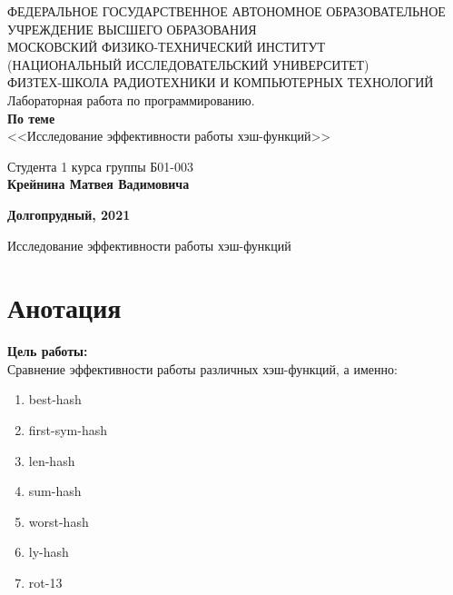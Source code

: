 \documentclass[a4paper,12pt]{article}
\begin{document}
\begin{center}
	\hfill \break
	\hfill \break
	{\small ФЕДЕРАЛЬНОЕ ГОСУДАРСТВЕННОЕ АВТОНОМНОЕ ОБРАЗОВАТЕЛЬНОЕ\\ УЧРЕЖДЕНИЕ ВЫСШЕГО ОБРАЗОВАНИЯ\\ МОСКОВСКИЙ ФИЗИКО-ТЕХНИЧЕСКИЙ ИНСТИТУТ\\ (НАЦИОНАЛЬНЫЙ ИССЛЕДОВАТЕЛЬСКИЙ УНИВЕРСИТЕТ)\\ ФИЗТЕХ-ШКОЛА РАДИОТЕХНИКИ И КОМПЬЮТЕРНЫХ ТЕХНОЛОГИЙ}\\

	\hfill \break
	\normalsize{Лабораторная работа по программированию. }\\
	\vspace{7em}
	\normalsize{\textbf{По теме}}\\
	\vspace{7em}
	\large{<<Исследование эффективности работы хэш-функций>>}\\
\end{center}

\vspace{16em}
\begin{flushright}
	\normalsize{Студента 1 курса группы Б01-003}\\
	\normalsize{\textbf{Крейнина Матвея Вадимовича}}\\
\end{flushright}

\vspace{\fill}
\begin{center}
	\normalsize{\textbf{Долгопрудный, 2021}}
\end{center}


\thispagestyle{empty} %
\newpage

	
	\begin{center}
		{\Large Исследование эффективности работы хэш-функций}
	\end{center}
	\section*{Анотация}
\noindent \textbf{Цель работы:} \\
\indent Сравнение эффективности работы различных хэш-функций, а именно:

\begin{enumerate}
\item best-hash
\item first-sym-hash
\item len-hash
\item sum-hash
\item worst-hash
\item ly-hash
\item rot-13
\end{enumerate}
\end{document}

